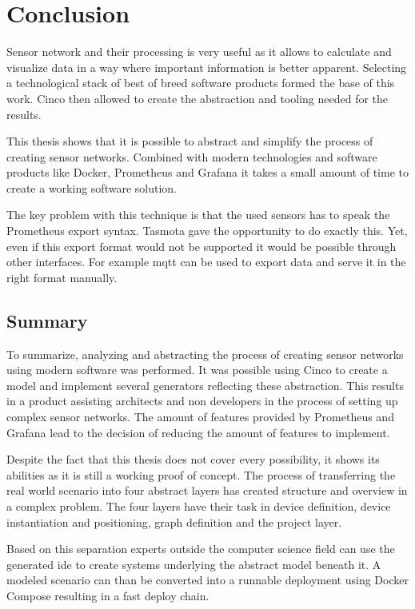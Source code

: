 \chapter{Conclusion}
\label{chapter:conclusion}
Sensor network and their processing is very useful as it allows to calculate and visualize data in a way where important information is better apparent. Selecting a technological stack of best of breed software products formed the base of this work. Cinco then allowed to create the abstraction and tooling needed for the results.

This thesis shows that it is possible to abstract and simplify the process of creating sensor networks. Combined with modern technologies and software products like Docker, Prometheus and Grafana it takes a small amount of time to create a working software solution. 

The key problem with this technique is that the used sensors has to speak the Prometheus export syntax. Tasmota gave the opportunity to do exactly this. Yet, even if this export format would not be supported it would be possible through other interfaces. For example \gls{mqtt} can be used to export data and serve it in the right format manually. 

\section{Summary}
To summarize, analyzing and abstracting the process of creating sensor networks using modern software was performed. It was possible using Cinco to create a model and implement several generators reflecting these abstraction. This results in a product assisting architects and non developers in the process of setting up complex sensor networks. The amount of features provided by Prometheus and Grafana lead to the decision of reducing the amount of features to implement. 

Despite the fact that this thesis does not cover every possibility, it shows its abilities as it is still a working proof of concept. The process of transferring the real world scenario into four abstract layers has created structure and overview in a complex problem. The four layers have their task in device definition, device instantiation and positioning, graph definition and the project layer. 

Based on this separation experts outside the computer science field can use the generated \gls{ide} to create systems underlying the abstract model beneath it. A modeled scenario can than be converted into a runnable deployment using Docker Compose resulting in a fast deploy chain.

